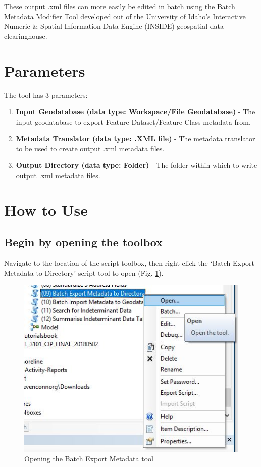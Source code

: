 \documentclass[openany]{book}
\providecommand{\tightlist}{%
  \setlength{\itemsep}{0pt}\setlength{\parskip}{0pt}}
\theoremstyle{definition}
\theoremstyle{definition}
\theoremstyle{definition}
\theoremstyle{remark}
\begin{document}
These output .xml files can more easily be edited in batch using the
\href{http://insideidaho.org/helpdocs/batch_metadata_modifier_tool.html}{Batch
Metadata Modifier Tool} developed out of the University of Idaho's
Interactive Numeric \& Spatial Information Data Engine (INSIDE)
geospatial data clearinghouse.

\section{Parameters}\label{parameters-10}

The tool has 3 parameters:

\begin{enumerate}
\def\labelenumi{\arabic{enumi}.}
\tightlist
\item
  \textbf{Input Geodatabase (data type: Workspace/File Geodatabase)} -
  The input geodatabase to export Feature Dataset/Feature Class metadata
  from.
\item
  \textbf{Metadata Translator (data type: .XML file)} - The metadata
  translator to be used to create output .xml metadata files.
\item
  \textbf{Output Directory (data type: Folder)} - The folder within
  which to write output .xml metadata files.
\end{enumerate}

\section{How to Use}\label{how-to-use-10}

\subsection{Begin by opening the
toolbox}\label{begin-by-opening-the-toolbox-10}

Navigate to the location of the script toolbox, then right-click the
`Batch Export Metadata to Directory' script tool to open (Fig.
\ref{fig:exMetaopen}).

\begin{figure}[H]

{\centering \includegraphics{figures/exMeta-open} 

}

\caption{Opening the Batch Export Metadata tool}\label{fig:exMetaopen}
\end{figure}
\end{document}
